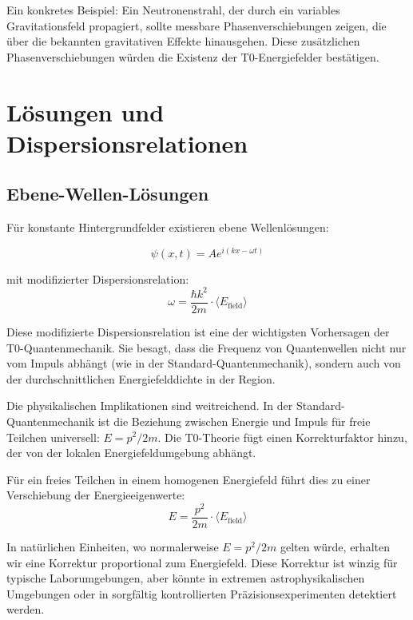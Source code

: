 \documentclass[12pt,a4paper]{article}
\theoremstyle{definition}
\theoremstyle{remark}
\begin{document}
Ein konkretes Beispiel: Ein Neutronenstrahl, der durch ein variables Gravitationsfeld propagiert, sollte messbare Phasenverschiebungen zeigen, die über die bekannten gravitativen Effekte hinausgehen. Diese zusätzlichen Phasenverschiebungen würden die Existenz der T0-Energiefelder bestätigen.

\section{Lösungen und Dispersionsrelationen}

\subsection{Ebene-Wellen-Lösungen}

Für konstante Hintergrundfelder existieren ebene Wellenlösungen:

\begin{equation}
	\psi(x,t) = A e^{i(kx - \omega t)}
	\label{eq:plane_wave}
\end{equation}

mit modifizierter Dispersionsrelation:
\begin{equation}
	\boxed{\omega = \frac{\hbar k^2}{2m} \cdot \langle E_{\text{field}} \rangle}
	\label{eq:modified_dispersion}
\end{equation}

Diese modifizierte Dispersionsrelation ist eine der wichtigsten Vorhersagen der T0-Quantenmechanik. Sie besagt, dass die Frequenz von Quantenwellen nicht nur vom Impuls abhängt (wie in der Standard-Quantenmechanik), sondern auch von der durchschnittlichen Energiefelddichte in der Region.

Die physikalischen Implikationen sind weitreichend. In der Standard-Quantenmechanik ist die Beziehung zwischen Energie und Impuls für freie Teilchen universell: $E = p^2/2m$. Die T0-Theorie fügt einen Korrekturfaktor hinzu, der von der lokalen Energiefeldumgebung abhängt.

Für ein freies Teilchen in einem homogenen Energiefeld führt dies zu einer Verschiebung der Energieeigenwerte:
$$E = \frac{p^2}{2m} \cdot \langle E_{\text{field}} \rangle$$

In natürlichen Einheiten, wo normalerweise $E = p^2/2m$ gelten würde, erhalten wir eine Korrektur proportional zum Energiefeld. Diese Korrektur ist winzig für typische Laborumgebungen, aber könnte in extremen astrophysikalischen Umgebungen oder in sorgfältig kontrollierten Präzisionsexperimenten detektiert werden.
\end{document}
